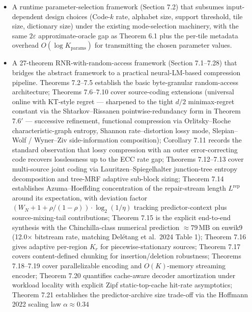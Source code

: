 \documentclass[
]{article}
\begin{document}
\begin{itemize}
  conformance for each named target requires implementation and
  testing per the conformance suite (engineering-spec document).
\item
  A runtime parameter-selection framework (Section 7.2) that subsumes
  input-dependent design choices (Code-$k$ rate, alphabet size,
  support threshold, tile size, dictionary size) under the existing
  mode-selection machinery, with the same $2\varepsilon$
  approximate-oracle gap as Theorem 6.1 plus the per-tile metadata
  overhead $O(\log K_{\text{params}})$ for transmitting the chosen
  parameter values.
\item
  A 27-theorem RNR-with-random-access framework (Section 7.1--7.28)
  that bridges the abstract framework to a practical neural-LM-based
  compression pipeline. Theorems 7.2--7.5 establish the basic
  byte-granular random-access architecture; Theorems 7.6--7.10 cover
  source-coding extensions (universal online with KT-style regret ---
  sharpened to the tight $d/2$ minimax-regret constant via the
  Shtarkov--Rissanen pointwise-redundancy form in Theorem 7.6$'$ ---
  successive refinement, functional compression via Orlitsky--Roche
  characteristic-graph entropy, Shannon rate--distortion lossy mode,
  Slepian--Wolf / Wyner--Ziv side-information composition); Corollary
  7.11 records the standard observation that lossy compression with
  an outer error-correcting code recovers losslessness up to the
  ECC rate gap; Theorems 7.12--7.13 cover multi-source joint coding
  via Lauritzen--Spiegelhalter junction-tree entropy decomposition
  and tree-MRF adaptive sub-block sizing; Theorem 7.14 establishes
  Azuma--Hoeffding concentration of the repair-stream length
  $L^{\mathrm{rep}}$ around its expectation, with deviation factor
  $(W_N+1+\rho/(1-\rho)) \cdot \log_2(1/\eta)$ tracking
  predictor-context plus source-mixing-tail contributions; Theorem 7.15
  is the explicit end-to-end synthesis with the
  Chinchilla-class numerical prediction $\approx 79\,\mathrm{MB}$ on
  enwik9 (12.0$\times$ bitstream rate, matching Delétang et al.\
  2024 Table 1); Theorem 7.16 gives adaptive per-region $K_r$ for
  piecewise-stationary sources; Theorem 7.17 covers content-defined
  chunking for insertion/deletion robustness; Theorems 7.18--7.19 cover
  parallelizable encoding and $O(K)$-memory streaming encoder;
  Theorem 7.20 quantifies cache-aware decoder amortization under
  workload locality with explicit Zipf static-top-cache hit-rate
  asymptotics; Theorem 7.21 establishes the predictor-archive
  size trade-off via the Hoffmann 2022 scaling law $\alpha \approx 0.34$

\end{itemize}
\end{document}
